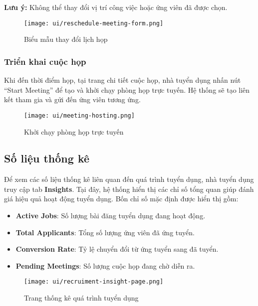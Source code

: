 \textbf{Lưu ý:} Không thể thay đổi vị trí công việc hoặc ứng viên đã được chọn.

\begin{figure}[H]
  \centering
  \texttt{[image: ui/reschedule-meeting-form.png]}
  \caption{Biểu mẫu thay đổi lịch họp}
  \label{fig:reschedule-meeting-form}
\end{figure}

\subsubsection{Triển khai cuộc họp}

Khi đến thời điểm họp, tại trang chi tiết cuộc họp, nhà tuyển dụng nhấn nút ``Start Meeting'' để tạo và khởi chạy phòng họp trực tuyến.  
Hệ thống sẽ tạo liên kết tham gia và gửi đến ứng viên tương ứng.

\begin{figure}[H]
  \centering
  \texttt{[image: ui/meeting-hosting.png]}
  \caption{Khởi chạy phòng họp trực tuyến}
  \label{fig:meeting-hosting}
\end{figure}

\subsection{Số liệu thống kê}

Để xem các số liệu thống kê liên quan đến quá trình tuyển dụng, nhà tuyển dụng truy cập tab \textbf{Insights}.  
Tại đây, hệ thống hiển thị các chỉ số tổng quan giúp đánh giá hiệu quả hoạt động tuyển dụng.
Bốn chỉ số mặc định được hiển thị gồm:
\begin{itemize}
  \item \textbf{Active Jobs}: Số lượng bài đăng tuyển dụng đang hoạt động.
  \item \textbf{Total Applicants}: Tổng số lượng ứng viên đã ứng tuyển.
  \item \textbf{Conversion Rate}: Tỷ lệ chuyển đổi từ ứng tuyển sang đã tuyển.
  \item \textbf{Pending Meetings}: Số lượng cuộc họp đang chờ diễn ra.
\end{itemize}

\begin{figure}[H]
  \centering
  \texttt{[image: ui/recruiment-insight-page.png]}
  \caption{Trang thống kê quá trình tuyển dụng}
  \label{fig:recruiment-insight-page}
\end{figure}

